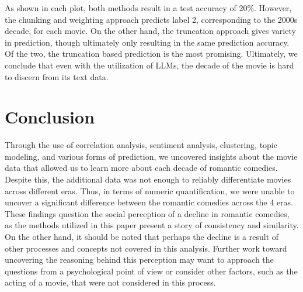 \documentclass[
  authoryear,
  preprint]{elsarticle}
\begin{document}
As shown in each plot, both methods result in a test accuracy of 20\%.
However, the chunking and weighting approach predicts label 2,
corresponding to the 2000s decade, for each movie. On the other hand,
the truncation approach gives variety in prediction, though ultimately
only resulting in the same prediction accuracy. Of the two, the
truncation based prediction is the most promising. Ultimately, we
conclude that even with the utilization of LLMs, the decade of the movie
is hard to discern from its text data.

\section{Conclusion}\label{conclusion}

Through the use of correlation analysis, sentiment analysis, clustering,
topic modeling, and various forms of prediction, we uncovered insights
about the movie data that allowed us to learn more about each decade of
romantic comedies. Despite this, the additional data was not enough to
reliably differentiate movies across different eras. Thus, in terms of
numeric quantification, we were unable to uncover a significant
difference between the romantic comedies across the 4 eras. These
findings question the social perception of a decline in romantic
comedies, as the methods utilized in this paper present a story of
consistency and similarity. On the other hand, it should be noted that
perhaps the decline is a result of other processes and concepts not
covered in this analysis. Further work toward uncovering the reasoning
behind this perception may want to approach the questions from a
psychological point of view or consider other factors, such as the
acting of a movie, that were not considered in this process.


\renewcommand\refname{References}
  
\end{document}
